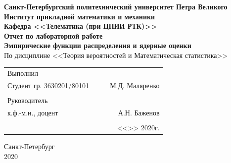 \documentclass[12pt]{article}
\begin{document}
\begin{titlepage}
	\begin{center}
		\hfill \break
		{\textbf{Санкт-Петербургский политехнический университет Петра Великого}}\\
		\hfill \break
		\textbf{Институт прикладной математики и механики}\\
		 \hfill \break
		\textbf{Кафедра <<Телематика (при ЦНИИ РТК)>>}\\
		\vfill
		\large{\bfseries Отчет по лабораторной работе}\\
		\hfill \break
		\hfill \break
		\hfill \break
		\hfill \break
		\normalsize{\bfseries Эмпирические функции распределения и ядерные оценки}\\
		По дисциплине <<Теория вероятностей и Математическая статистика>>\\
		\hfill \break
		\hfill \break
		\hfill \break
	\end{center}
 
	\normalsize
	{ 
		\begin{tabular}{lp{2cm}cr}
			Выполнил &&&\\
			Студент гр. 3630201/80101&&\underline{\hspace{1.5cm}}& М.Д. Маляренко\\\\
			Руководитель&&&\\ 
			к.ф.-м.н., доцент && \underline{\hspace{1.5cm}}& А.Н. Баженов \\\\
			&&&<<\underline{\phantom{333}}>>\underline{\phantom{сентября000}}
			2020г.
		\end{tabular}
	}
\vfill

\begin{center} Санкт-Петербург \\2020 \end{center}
\end{titlepage}

\newpage

\setcounter{page}{2}
\end{document}
